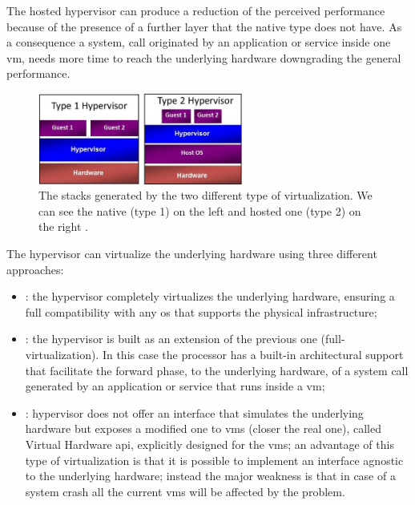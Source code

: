The hosted hypervisor can produce a reduction of the perceived performance because of the presence of a 
further layer that the native type does not have. As a consequence a system, call originated by an 
application or service inside one \ac{vm}, needs more time to reach the underlying hardware downgrading 
the general performance.

\begin{figure}
	\centering{}
	\includegraphics[width=0.6\textwidth]{chapters/background/images/virtualization-types.png}
	\caption[Virtualization and containerization]{The stacks generated by the two different type of
		virtualization. We can see the native (type 1) on the left and hosted one (type 2) on the right
		\cite{virtualizationTypes}.}
	\label{img:background-deployments-virtualization-types}
\end{figure}

The hypervisor can virtualize the underlying hardware using three different approaches:

\begin{itemize}
	\item{: the hypervisor completely virtualizes the underlying hardware,
		ensuring a full compatibility with any \acs{os} that supports the physical infrastructure;}
	\item{: the hypervisor is built as an extension of the
		previous one (full-virtualization). In this case the processor has a built-in architectural support
		that facilitate the forward phase, to the underlying hardware, of a system call generated by an
		application or service that runs inside a \ac{vm};}
	\item{: hypervisor does not offer an interface that simulates the
		underlying hardware but exposes a modified one to \ac{vm}s (closer the real one), called Virtual
		Hardware \acs{api}, explicitly designed for the \ac{vm}s; an advantage of this type of virtualization
		is that it is possible to implement an interface agnostic to the underlying hardware; instead
		the major weakness is that in case of a system crash all the current \ac{vm}s will be affected by
		the problem.}
\end{itemize}

